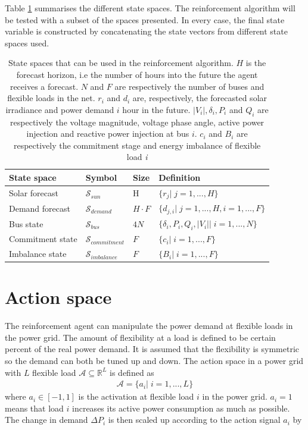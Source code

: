 \documentclass[class=book, crop=false]{standalone}
\begin{document}
Table \ref{table:state_spaces} summarises the different state spaces. The reinforcement algorithm will be tested with a subset of the spaces presented. In every case, the final state variable is constructed by concatenating the state vectors from different state spaces used. 

\begin{table}[ht]
\centering
\caption{State spaces that can be used in the reinforcement algorithm. $H$ is the forecast horizon, i.e the number of hours into the future the agent receives a forecast. $N$ and $F$ are respectively the number of buses and flexible loads in the net. $r_{i}$ and $d_{i}$ are, respectively, the forecasted solar irradiance and power demand $i$ hour in the future. $|V_{i}|,\delta_{i}, P_{i}$ and $Q_{i}$ are respectively the voltage magnitude, voltage phase angle, active power injection and reactive power injection at bus $i$. $c_{i}$ and $B_{i}$ are respectively the commitment stage and energy imbalance of flexible load \textit{i}}
\label{table:state_spaces}
\begin{tabular}{l|lll}

State space  & Symbol & Size & Definition
\\ 
\hline
Solar forecast      & $\mathcal{S}_{sun}$& H  &  $\{r_{j} |\;j=1,...,H\}$
\\ 

Demand forecast    & $\mathcal{S}_{demand}$ &$H\cdot F$ &$\{d_{j,i} |\;j=1,...,H,i=1,...,F\}$  \\ 
Bus state & $\mathcal{S}_{bus}$ & $4N$ &$\{\delta_{i}, P_{i}, Q_{i}, |V_{i}| |\; i = 1,...,N\}$\\

Commitment state &$\mathcal{S}_{commitment}$& $F$  &$\{ c_{i} |\; i = 1,...,F\}$ \\
 
Imbalance state &$\mathcal{S}_{imbalance}$& $F$  &$\{ B_{i} |\; i = 1,...,F\}$ \\

\hline
\end{tabular}
\end{table}
\section{Action space}
The reinforcement agent can manipulate the power demand at flexible loads in the power grid. The amount of flexibility at a load is defined to be certain percent of the real power demand. It is assumed that the flexibility is symmetric so the demand can both be tuned up and down. The action space in a power grid with $L$ flexible load  $\mathcal{A}  \subseteq \mathbb{R}^{L}$ is defined as
\begin{equation}
   \begin{aligned}
   \label{eq:problem:action_space}
\mathcal{A}= \{a_{i} | \;i = 1,...,L\}
    \end{aligned} 
\end{equation}
where $a_{i} \in [-1,1]$ is the activation at flexible load $i$ in the power grid. $a_{i} = 1$ means that load $i$ increases its active power consumption as much as possible. The change in demand $\Delta P_{i}$ is then scaled up according to the action signal $a_{i}$ by
\end{document}
